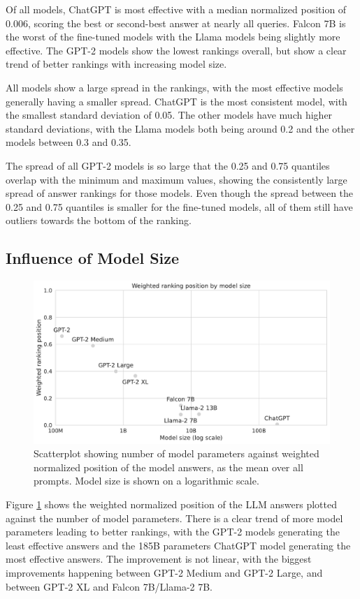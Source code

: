 Of all models, ChatGPT is most effective with a median normalized position of 0.006, scoring the best or second-best answer at nearly all queries.
Falcon 7B is the worst of the fine-tuned models with the Llama models being slightly more effective.
The GPT-2 models show the lowest rankings overall, but show a clear trend of better rankings with increasing model size.

All models show a large spread in the rankings, with the most effective models generally having a smaller spread.
ChatGPT is the most consistent model, with the smallest standard deviation of 0.05.
The other models have much higher standard deviations, with the Llama models both being around 0.2 and the other models between 0.3 and 0.35.

The spread of all GPT-2 models is so large that the 0.25 and 0.75 quantiles overlap with the minimum and maximum values, showing the consistently large spread of answer rankings for those models.
Even though the spread between the 0.25 and 0.75 quantiles is smaller for the fine-tuned models, all of them still have outliers towards the bottom of the ranking.


\subsection{Influence of Model Size}
\begin{figure}
    \centering
    \includegraphics[width=\textwidth]{images/weighted_position_vs_model_size.pdf}
    \caption{Scatterplot showing number of model parameters against weighted normalized position of the model answers, as the mean over all prompts. Model size is shown on a logarithmic scale.}
    \label{fig:weighted_position_vs_model_size}
\end{figure}

Figure \ref{fig:weighted_position_vs_model_size} shows the weighted normalized position of the LLM answers plotted against the number of model parameters.
There is a clear trend of more model parameters leading to better rankings, with the GPT-2 models generating the least effective answers and the 185B parameters ChatGPT model generating the most effective answers.
The improvement is not linear, with the biggest improvements happening between GPT-2 Medium and GPT-2 Large, and between GPT-2 XL and Falcon 7B/Llama-2 7B.


